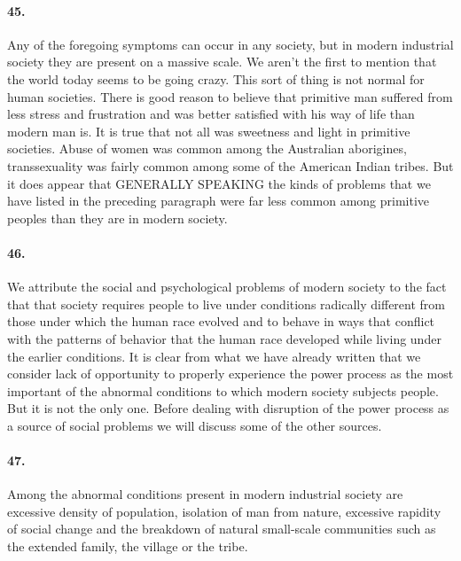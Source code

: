 \documentclass[12pt]{book}
\begin{document}
\paragraph{45.} Any of the foregoing symptoms can occur in any society, but in modern industrial society they are present on a massive scale. We aren't the first to mention that the world today seems to be going crazy. This sort of thing is not normal for human societies. There is good reason to believe that primitive man suffered from less stress and frustration and was better satisfied with his way of life than modern man is. It is true that not all was sweetness and light in primitive societies. Abuse of women was common among the Australian aborigines, transsexuality was fairly common among some of the American Indian tribes. But it does appear that GENERALLY SPEAKING the kinds of problems that we have listed in the preceding paragraph were far less common among primitive peoples than they are in modern society.


\paragraph{46.} We attribute the social and psychological problems of modern society to the fact that that society requires people to live under conditions radically different from those under which the human race evolved and to behave in ways that conflict with the patterns of behavior that the human race developed while living under the earlier conditions. It is clear from what we have already written that we consider lack of opportunity to properly experience the power process as the most important of the abnormal conditions to which modern society subjects people. But it is not the only one. Before dealing with disruption of the power process as a source of social problems we will discuss some of the other sources.


\paragraph{47.} Among the abnormal conditions present in modern industrial society are excessive density of population, isolation of man from nature, excessive rapidity of social change and the breakdown of natural small-scale communities such as the extended family, the village or the tribe.
\end{document}
